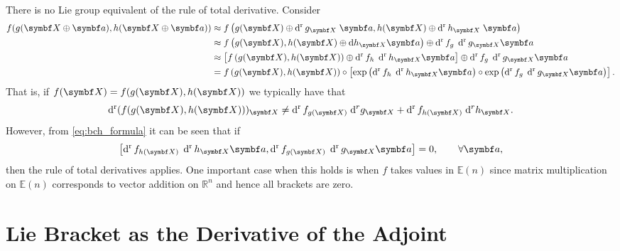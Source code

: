 \begin{remark}
  \label{remark:total_derivative}
  There is no Lie group equivalent of the rule of total derivative. Consider
  \begin{equation}
    \begin{aligned}
      f(g(\X \oplus \a), h(\X \oplus \a))
       & \approx f \left( g(\X) \oplus \dr g_\X \; \a , h(\X) \oplus \dr h_\X \; \a \right)                                                                    \\
       & \approx f \left( g(\X) , h(\X) \oplus \mathrm{d} h_\X \a \right) \oplus \dr f_{g} \; \dr g_\X \a                                                      \\
       & \approx \left[ f \left( g(\X) , h(\X) \right) \oplus \dr f_h \; \dr h_\X \a \right] \oplus \dr f_{g} \; \dr g_\X \a                                   \\
       & =  f \left( g(\X) , h(\X) \right) \circ \left[ \exp\left( \dr f_h \; \dr h_\X \a  \right) \circ \exp\left ( \dr f_{g} \; \dr g_\X \a \right) \right].
    \end{aligned}
  \end{equation}
  That is, if $f(\X) = f(g(\X), h(\X))$ we typically have that
  \begin{equation}
    \dr (f(g(\X), h(\X)))_\X  \neq  \dr f_{g(\X)} \; \mathrm {d}^r g_\X + \dr f_{h(\X)} \; \mathrm {d}^r h_\X.
  \end{equation}
  However, from \eqref{eq:bch_formula} it can be seen that if
  \begin{equation}
    \left[ \dr f_{h(\X)} \; \dr h_\X \a  ,   \dr f_{g(\X)} \; \dr g_\X \a  \right] = 0, \qquad \forall \a,
  \end{equation}
  then the rule of total derivatives applies. One important case when this holds is when $f$ takes values in $\mathbb{E}(n)$ since matrix multiplication on $\mathbb{E}(n)$ corresponds to vector addition on $\mathbb{R}^n$ and hence all brackets are zero.
\end{remark}

\section{Lie Bracket as the Derivative of the Adjoint}

